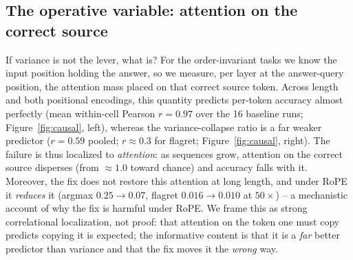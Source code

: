 \documentclass[11pt]{article}
\begin{document}
\subsection{The operative variable: attention on the correct source}
If variance is not the lever, what is? For the order-invariant tasks we know the input position holding
the answer, so we measure, per layer at the answer-query position, the attention mass placed on that
correct source token. Across length and both positional encodings, this quantity predicts per-token
accuracy almost perfectly (mean within-cell Pearson $r=0.97$ over the 16 baseline runs;
Figure~\ref{fig:causal}, left), whereas the variance-collapse ratio is a far weaker predictor
($r=0.59$ pooled; $r\approx0.3$ for flagret; Figure~\ref{fig:causal}, right). The failure is thus
localized to \emph{attention}: as sequences grow, attention on the correct source disperses (from
$\approx1.0$ toward chance) and accuracy falls with it. Moreover, the fix does not restore this attention
at long length, and under RoPE it \emph{reduces} it (argmax $0.25\!\to\!0.07$, flagret
$0.016\!\to\!0.010$ at $50\times$) -- a mechanistic account of why the fix is harmful under RoPE. We frame
this as strong correlational localization, not proof: that attention on the token one must copy predicts
copying it is expected; the informative content is that it is a \emph{far} better predictor than variance
and that the fix moves it the \emph{wrong} way.
\end{document}
